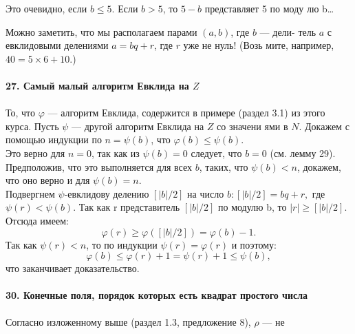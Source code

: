 \documentclass{mai_book}
\begin{document}
\noindent Это очевидно, если $b \leqslant 5$. Если $b > 5$,  то $5 - b$  представляет 5 по моду­\linebreak
лю b\ldots

Можно заметить, что мы располагаем парами $(a,b)$, где $b$ --- дели-\linebreak
тель $a$  с евклидовыми делениями $a = bq + r$, где $r$ уже не нуль! (Возь­\linebreak
мите, например, $40 = 5 \times 6 + 10$.)\\
\\
\noindent\textbf{27. Самый малый алгоритм Евклида на $Z$}\\
\\
\hspace*{15pt} То, что $\varphi$ ---  алгоритм Евклида, содержится в примере (раздел 3.1)\linebreak
из этого курса. Пусть $\psi$ --- другой алгоритм Евклида на $Z$  со значени­\linebreak
ями в $N$. Докажем с помощью индукции по $n =\psi(b)$, что $\varphi(b) \leqslant \psi(b)$.\\
\hspace*{15pt} Это верно для $n = 0$, так как из $\psi(b) = 0$ следует, что $b = 0$\linebreak
(см. лемму 29). Предположив, что это выполняется для всех $b$, таких,\linebreak
что $\psi(b) < n$,  докажем, что оно верно и для $\psi(b) = n$.\\
\hspace*{15pt} Подвергнем $\psi$-евклидову делению $[|b|/2]$ на число $b:[|b|/2] = bq+r,$\linebreak
где $\psi(r) < \psi(b)$. Так как r  представитель $[|b|/2]$ по модулю  b, то \linebreak
$|r| \geqslant [|b|/2]$. Отсюда имеем: 
$$\varphi(r) \geqslant \varphi([|b|/2]) = \varphi(b) - 1.$$
Так как $\psi(r) < n$, то по индукции $\psi(r) = \varphi(r)$ и поэтому:
$$\varphi(b) \leqslant \varphi(r) + 1 = \psi(r) + 1 \leqslant \psi(b),$$
что заканчивает доказательство.\\
\\
\noindent\textbf{30. Конечные поля, порядок которых есть квадрат\linebreak
простого числа}\\
\\
\hspace*{15pt} Согласно изложенному выше (раздел 1.3, предложение 8), $\rho$ --- не­\linebreak
\end{document}
